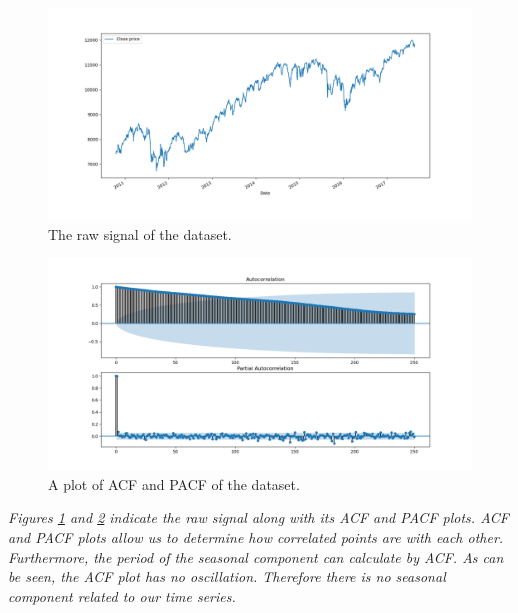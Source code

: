 \begin{figure}[H]
    \centering
    \begin{minipage}[b]{1\textwidth}
        \includegraphics[width=\textwidth]{figures/Ass2/Ass2_Q2_raw_signal.png}
    \end{minipage}
    \caption{The raw signal of the dataset.}
    \label{fig:Ass2_Q2_raw_signal}
\end{figure}

\begin{figure}[H]
    \centering
    \begin{minipage}[b]{1\textwidth}
        \includegraphics[width=\textwidth]{figures/Ass2/Ass2_Q2_PACF_ACF.png}
    \end{minipage}
    \caption{A plot of \gls{ACF} and \gls{PACF} of the dataset.}
    \label{fig:Ass2_Q2_PACF_ACF}
\end{figure}


\textit{Figures \ref{fig:Ass2_Q2_raw_signal} and \ref{fig:Ass2_Q2_PACF_ACF} indicate the raw signal along with its \gls{ACF} and \gls{PACF} plots. \gls{ACF} and \gls{PACF} plots allow us to determine how correlated points are with each other. Furthermore, the period of the seasonal component can calculate by \gls{ACF}. As can be seen, the \gls{ACF} plot has no oscillation. Therefore there is no seasonal component related to our time series.}




